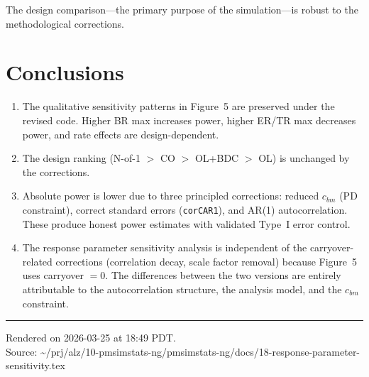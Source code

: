 \documentclass[11pt]{article}
\begin{document}
The design comparison---the primary purpose of the
simulation---is robust to the methodological corrections.

\section{Conclusions}

\begin{enumerate}
\item The qualitative sensitivity patterns in Figure~5 are
  preserved under the revised code. Higher BR max increases
  power, higher ER/TR max decreases power, and rate effects
  are design-dependent.

\item The design ranking (N-of-1 $>$ CO $>$ OL+BDC $>$ OL)
  is unchanged by the corrections.

\item Absolute power is lower due to three principled
  corrections: reduced $c_{bm}$ (PD constraint), correct
  standard errors (\texttt{corCAR1}), and AR(1)
  autocorrelation. These produce honest power estimates
  with validated Type~I error control.

\item The response parameter sensitivity analysis is
  independent of the carryover-related corrections
  (correlation decay, scale factor removal) because
  Figure~5 uses carryover $= 0$. The differences between
  the two versions are entirely attributable to the
  autocorrelation structure, the analysis model, and the
  $c_{bm}$ constraint.
\end{enumerate}

\vfill
\noindent\rule{\textwidth}{0.4pt}
{\footnotesize
Rendered on 2026-03-25 at 18:49 PDT.\\
Source: \textasciitilde/prj/alz/10-pmsimstats-ng/pmsimstats-ng/docs/18-response-parameter-sensitivity.tex}
\end{document}
